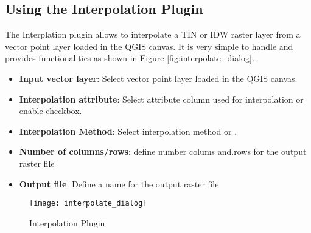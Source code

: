 \subsection{Using the Interpolation Plugin}

\updatedisclaimer

The Interplation plugin allows to interpolate a TIN or IDW raster layer from a vector 
point layer loaded in the QGIS canvas. It is very simple to handle and provides 
functionalities as shown in Figure \ref{fig:interpolate_dialog}.

\begin{itemize}
\item \textbf{Input vector layer}: Select vector point layer loaded in the QGIS canvas.
\item \textbf{Interpolation attribute}: Select attribute column used for interpolation or 
enable  checkbox.
\item \textbf{Interpolation Method}: Select interpolation method  or .
\item \textbf{Number of columns/rows}: define number colums and.rows for the output raster file
\item \textbf{Output file}: Define a name for the output raster file
\end{itemize}

\begin{figure}[ht]
   \begin{center}
   \caption{Interpolation Plugin \nixcaption}\label{fig:interpolation_dialog}\smallskip
   \texttt{[image: interpolate\_dialog]}
\end{center}  
\end{figure}

